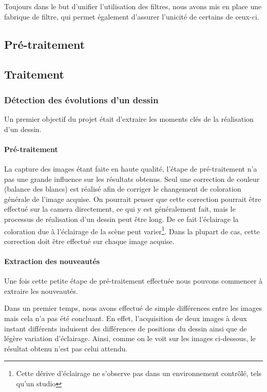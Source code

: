 Toujours dans le but d'unifier l'utilisation des filtres, nous avons mis en place une fabrique de filtre, qui permet également d'assurer l'unicité de certains de ceux-ci.

\subsection{Pré-traitement} %


\subsection{Traitement}
\subsubsection{Détection des évolutions d'un dessin}
Un premier objectif du projet était d'extraire les moments clés de la réalisation d'un dessin.

\paragraph{Pré-traitement\\}
La capture des images étant faite en haute qualité, l'étape de pré-traitement n'a pas une grande influence sur les résultats obtenus. Seul une correction de couleur (balance des blancs) est réalisé afin de corriger le changement de coloration générale de l'image acquise. On pourrait penser que cette correction pourrait être effectué sur la camera directement, ce qui y est généralement fait, mais le processus de réalisation d'un dessin peut être long. De ce fait l'éclairage la coloration due à l'éclairage de la scène peut varier\footnote{Cette dérive d'éclairage ne s'observe pas dans un environnement contrôlé, tels qu'un studio}. Dans la plupart de cas, cette correction doit être effectué sur chaque image acquise.

\paragraph{Extraction des nouveautés\\}
Une fois cette petite étape de pré-traitement effectuée nous pouvons commencer à extraire les nouveautés.

Dans un premier temps, nous avons effectué de simple différences entre les images mais cela n'a pas été concluant. En effet, l'acquisition de deux images à deux instant différents induisent des différences de positions du dessin ainsi que de légère variation d'éclairage. Ainsi, comme on le voit sur les images ci-dessous, le résultat obtenu n'est pas celui attendu. 

